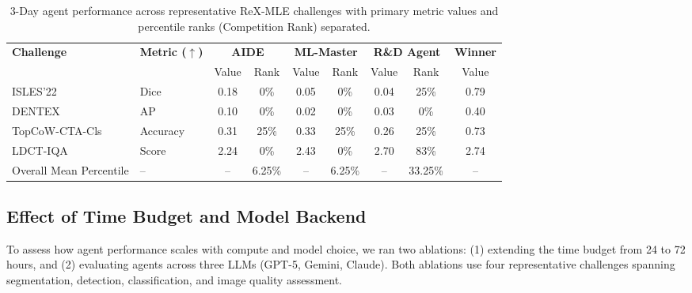 \documentclass{midl} %
\begin{document}
\begin{table}[t]
\centering
\footnotesize	
\caption{3-Day agent performance across representative ReX-MLE challenges with primary metric values and percentile ranks (Competition Rank) separated.}
\label{tab:3_day_performance_split}
\begin{tabular}{l l 
                c c 
                c c 
                c c 
                c}
\toprule
\textbf{Challenge} & \textbf{Metric ($\uparrow$)} 
& \multicolumn{2}{c}{\textbf{AIDE}} 
& \multicolumn{2}{c}{\textbf{ML-Master}} 
& \multicolumn{2}{c}{\textbf{R\&D Agent}} 
& \textbf{Winner} \\
\cmidrule(lr){3-4}\cmidrule(lr){5-6}\cmidrule(lr){7-8}
& & Value & Rank & Value & Rank & Value & Rank & Value \\
\midrule
ISLES'22          & Dice     & 0.18 & 0\%  & 0.05 & 0\%  & 0.04 & 25\% & 0.79 \\
DENTEX            & AP       & 0.10 & 0\%  & 0.02 & 0\%  & 0.03 & 0\%  & 0.40 \\
TopCoW-CTA-Cls    & Accuracy & 0.31 & 25\% & 0.33 & 25\% & 0.26 & 25\% & 0.73 \\
LDCT-IQA          & Score    & 2.24 & 0\%  & 2.43 & 0\%  & 2.70 & 83\% & 2.74 \\
\midrule
Overall Mean Percentile & -- & -- & 6.25\% & -- & 6.25\% & -- & 33.25\% & -- \\
\bottomrule
\end{tabular}
\end{table}

\subsection{Effect of Time Budget and Model Backend}
To assess how agent performance scales with compute and model choice, we ran two ablations: (1) extending the time budget from 24 to 72 hours, and (2) evaluating agents across three LLMs (GPT-5, Gemini, Claude). Both ablations use four representative challenges spanning segmentation, detection, classification, and image quality assessment.
\end{document}
